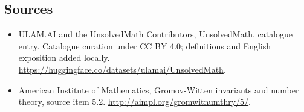 \documentclass[11pt]{article}
\begin{document}
\subsection{Sources}
\begin{itemize}
\item[\hypertarget{source:statement:1}{S1}] ULAM.AI and the UnsolvedMath Contributors, UnsolvedMath, catalogue entry. Catalogue curation under CC BY 4.0; definitions and English exposition added locally.
\url{https://huggingface.co/datasets/ulamai/UnsolvedMath}.
\item[\hypertarget{source:statement:2}{S2}] American Institute of Mathematics, Gromov-Witten invariants and number theory, source item 5.2.
\url{http://aimpl.org/gromwitnumthry/5/}.
\end{itemize}
\label{end:statement}
\end{document}
